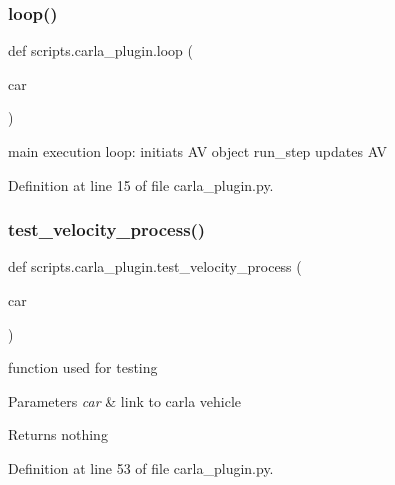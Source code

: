 \mbox{\label{namespacescripts_1_1carla__plugin_a23dd1a2cff4ea023f7d9a2ebad524014}} 
\subsubsection{\texorpdfstring{loop()}{loop()}}
{\footnotesize\ttfamily def scripts.\+carla\+\_\+plugin.\+loop (\begin{DoxyParamCaption}\item[{}]{car }\end{DoxyParamCaption})}

\begin{DoxyVerb}main execution loop:
        initiats AV object
        run_step updates AV
\end{DoxyVerb}
 

Definition at line 15 of file carla\+\_\+plugin.\+py.

\mbox{\label{namespacescripts_1_1carla__plugin_a6d9a5090669749d928df2f9af020588f}} 
\subsubsection{\texorpdfstring{test\+\_\+velocity\+\_\+process()}{test\_velocity\_process()}}
{\footnotesize\ttfamily def scripts.\+carla\+\_\+plugin.\+test\+\_\+velocity\+\_\+process (\begin{DoxyParamCaption}\item[{}]{car }\end{DoxyParamCaption})}



function used for testing 


\begin{DoxyParams}{Parameters}
{\em car} & link to carla vehicle \\
\hline
\end{DoxyParams}
\begin{DoxyReturn}{Returns}
nothing 
\end{DoxyReturn}


Definition at line 53 of file carla\+\_\+plugin.\+py.

